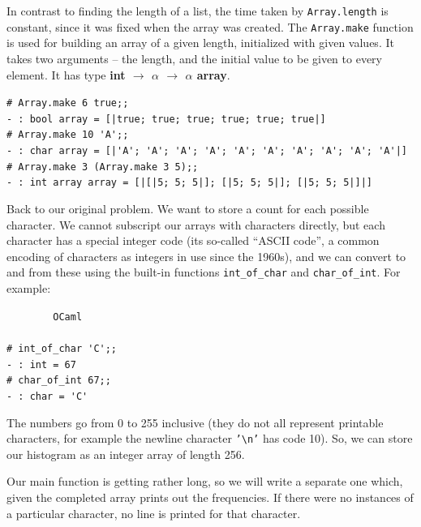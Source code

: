 \documentclass[]{book}
\newcommand{\smspace}{\vspace{4mm}}
\begin{document}
\noindent In contrast to finding the length of a list, the time taken by \texttt{Array.length} is constant, since it was fixed when the array was created. The \texttt{Array.make} function is used for building an array of a given length, initialized with given values. It takes two arguments -- the length, and the initial value to be given to every element. It has type \textsf{\textbf{int $\rightarrow$ $\alpha$ $\rightarrow$ $\alpha$ array}}.

\smspace
\noindent\verb!# Array.make 6 true;;!\\
\noindent\verb!- : bool array = [|true; true; true; true; true; true|]!\\
\noindent\verb!# Array.make 10 'A';;!\\
\noindent\verb!- : char array = [|'A'; 'A'; 'A'; 'A'; 'A'; 'A'; 'A'; 'A'; 'A'; 'A'|]!\\
\noindent\verb!# Array.make 3 (Array.make 3 5);;!\\
\noindent\verb!- : int array array = [|[|5; 5; 5|]; [|5; 5; 5|]; [|5; 5; 5|]|]!
\smspace 

\noindent Back to our original problem. We want to store a count for each possible character. We cannot subscript our arrays with characters directly, but each character has a special integer code (its so-called ``ASCII code'', a common encoding of characters as integers in use since the 1960s), and we can convert to and from these using the built-in functions \texttt{int\_of\_char} and \texttt{char\_of\_int}. For example:

\smspace
\noindent\verb!        OCaml!\\
\noindent\\
\noindent\verb!# int_of_char 'C';;!\\
\noindent\verb!- : int = 67!\\
\noindent\verb!# char_of_int 67;;!\\
\noindent\verb!- : char = 'C'!\vphantom{g}
\smspace

\noindent The numbers go from 0 to 255 inclusive (they do not all represent printable characters, for example the newline character \texttt{'\textbackslash n'} has code 10). So, we can store our histogram as an integer array of length 256.

Our main function is getting rather long, so we will write a separate one which, given the completed array prints out the frequencies. If there were no instances of a particular character, no line is printed for that character.
\end{document}
